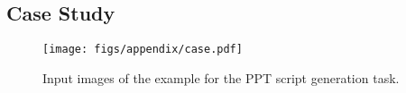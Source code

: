 




\clearpage
\subsection{Case Study}
\label{sec:case}


\begin{figure}[htbp]
    \centering
    \texttt{[image: figs/appendix/case.pdf]}
    \caption{Input images of the example for the PPT script generation task.}
    \label{fig:input_case}
\end{figure}


